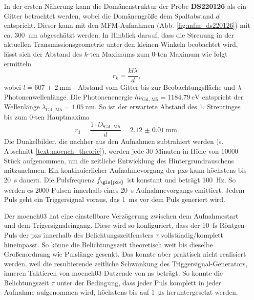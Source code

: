 \noindent
In der ersten Näherung kann die Domänenstruktur der Probe \textbf{DS220126} als ein Gitter betrachtet werden, wobei die Domänengröße dem Spaltabstand $d$ entspricht. Dieser kann mit den MFM-Aufnahmen (Abb. \ref{fig:mfm_ds220126}) mit ca. \SI{300}{\nano\meter} abgeschätzt werden. In Hinblick darauf, dass die Streuung in der aktuellen Transmissionsgeometrie unter den kleinen Winkeln beobachtet wird, lässt sich der Abstand des $k$-ten Maximums zum $0$-ten Maximum wie folgt ermitteln
\begin{equation}
     r_{k} = \frac{kl\lambda}{d},
 \end{equation}
 wobei $l = \SI{607(2)}{\milli\meter}$ - Abstand vom Gitter bis zur Beobachtungsfläche und $\lambda$ - Photonenwellenlänge. Die Photonenenergie $h\nu_{\text{Gd, M5}} = \SI{1184,79}{\eV}$ entspricht der Wellenlänge $\lambda_{\text{Gd, M5}} = \SI{1,05}{\nano\meter}$. So ist der erwartete Abstand des 1. Streuringes bis zum $0$-ten Hauptmaxima 
 \begin{equation}
     r_{1} = \frac{1 \cdot l\lambda_{\text{Gd, M5}}}{d} = \SI{2.12(1)}{\milli\meter}.
\end{equation}
\noindent
Die Dunkelbilder, die nachher aus den Aufnahmen subtrahiert werden (s. Abschnitt \ref{text:moench_theorie}), werden jede 30 Minuten in Höhe von \num{10000} Stück aufgenommen, um die zeitliche Entwicklung des Hintergrundrauschens mitzunehmen. Ein kontinuierlicher Aufnahmevorgang der \gls{pxs} kann höchstens bis \SI{20}{\second} dauern. Die Pulsfrequenz $f_\text{\gls{pxs}}$ ist konstant und beträgt \SI{100}{\hertz}. So werden es \num{2000} Pulsen innerhalb eines \SI{20}{\second} Aufnahmevorgangs emittiert. Jedem Puls geht ein Triggersignal voraus, das \SI{1}{\milli\second} vor dem Puls generiert wird.

\noindent
Der \gls{moench03} hat eine einstellbare Verzögerung zwischen dem Aufnahmestart und dem Trigersignaleingang. Diese wird so konfiguriert, dass der \SI{10}{\femto\second} Röntgen-Puls der \gls{pxs} innerhalb des Belichtungszeitfensters $\tau$ vollständig/komplett hineinpasst. So könne die Belichtungszeit theoretisch weit bis dieselbe Großenordnung wie Pulslänge gesenkt. Das konnte aber praktisch nicht realisiert werden, weil die resultierende zeitliche Schwankung des Triggersignal-Generators, inneren Taktieren von \gls{moench03} Dutzende von \si{\nano\second} beträgt. So konnte die Belichtungszeit $\tau$ unter der Bedingung, dass jeder Puls komplett in jeder Aufnahme aufgenommen wird, höchstens bis auf \SI{1}{\micro\second} heruntergesetzt werden.

